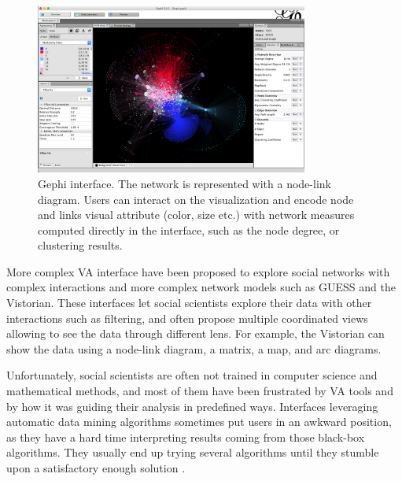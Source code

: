 \begin{figure}
    \centering %
    \includegraphics[width=0.8\textwidth]{static/figures/RelatedWork/Gephi_0.9.1_Network_Analysis_and_Visualization_Software}
    \caption{Gephi \cite{Gephi} interface. The network is represented with a node-link diagram. Users can interact on the visualization and encode node and links visual attribute (color, size etc.) with network measures computed directly in the interface, such as the node degree, or clustering results.}
    \label{fig:gephi}
\end{figure}
More complex VA interface have been proposed to explore social networks with complex interactions and more complex network models such as GUESS\cite{adarGUESSLanguageInterface2006} and the Vistorian\cite{serranomolineroUnderstandingUseVistorian2017}.
These interfaces let social scientists explore their data with other interactions such as filtering, and often propose multiple coordinated views allowing to see the data through different lens.
For example, the Vistorian can show the data using a node-link diagram, a matrix, a map, and arc diagrams.

Unfortunately, social scientists are often not trained in computer science and mathematical methods, and most of them have been frustrated by VA tools and by how it was guiding their analysis in predefined ways.
Interfaces leveraging automatic data mining algorithms sometimes put users in an awkward position, as they have a hard time interpreting results coming from those black-box algorithms.
They usually end up trying several algorithms until they stumble upon a satisfactory enough solution \cite{pisterIntegratingPriorKnowledge2021}.

